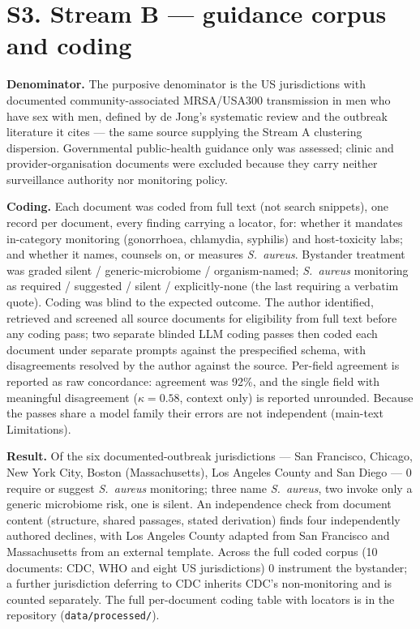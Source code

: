 \documentclass[11pt,a4paper]{article}
\newcommand{\sa}{\emph{S.~aureus}}
\begin{document}
\section*{S3. Stream B --- guidance corpus and coding}

\textbf{Denominator.} The purposive denominator is the US jurisdictions with
documented community-associated MRSA/USA300 transmission in men who have sex with
men, defined by de Jong's systematic review and the outbreak literature it cites
--- the same source supplying the Stream A clustering dispersion. Governmental
public-health guidance only was assessed; clinic and provider-organisation
documents were excluded because they carry neither surveillance authority nor
monitoring policy.

\textbf{Coding.} Each document was coded from full text (not search snippets), one
record per document, every finding carrying a locator, for: whether it mandates
in-category monitoring (gonorrhoea, chlamydia, syphilis) and host-toxicity labs;
and whether it names, counsels on, or measures \sa{}. Bystander treatment was
graded silent / generic-microbiome / organism-named; \sa{} monitoring as required
/ suggested / silent / explicitly-none (the last requiring a verbatim quote).
Coding was blind to the expected outcome. The author identified, retrieved and
screened all source documents for eligibility from full text before any coding
pass; two separate blinded LLM coding passes then coded each document under
separate prompts against the prespecified schema, with disagreements resolved by
the author against the source. Per-field agreement is reported as raw concordance:
agreement was 92\%, and the single field with meaningful disagreement
($\kappa=0.58$, context only) is reported unrounded. Because the passes share a
model family their errors are not independent (main-text Limitations).

\textbf{Result.} Of the six documented-outbreak jurisdictions --- San Francisco,
Chicago, New York City, Boston (Massachusetts), Los Angeles County and San Diego
--- 0 require or suggest \sa{} monitoring; three name \sa{}, two invoke only a
generic microbiome risk, one is silent. An independence check from document
content (structure, shared passages, stated derivation) finds four independently
authored declines, with Los Angeles County adapted from San Francisco and
Massachusetts from an external template. Across the full coded corpus (10
documents: CDC, WHO and eight US jurisdictions) 0 instrument the bystander; a
further jurisdiction deferring to CDC inherits CDC's non-monitoring and is counted
separately. The full per-document coding table with locators is in the repository
(\texttt{data/processed/}).
\end{document}
